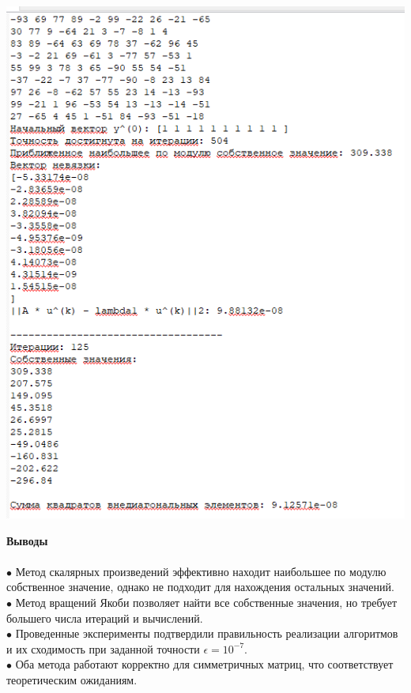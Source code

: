 \documentclass[a4paper, 12pt]{report}
\begin{document}
   \begin{center}
        \includegraphics[scale = 0.99]{pic13.png}
   \end{center}

   

    \newpage
   \textbf{\Huge{Выводы}}\\\\
   $\bullet$ Метод скалярных произведений эффективно находит наибольшее по модулю собственное значение, однако не подходит для нахождения остальных значений.\\
   $\bullet$ Метод вращений Якоби позволяет найти все собственные значения, но требует большего числа итераций и вычислений.\\
   $\bullet$ Проведенные эксперименты подтвердили правильность реализации алгоритмов и их сходимость при заданной точности $\epsilon = 10^{-7}$.\\
    $\bullet$ Оба метода работают корректно для симметричных матриц, что соответствует теоретическим ожиданиям.\\

   
\end{document}
